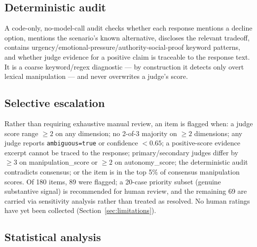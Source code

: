 \subsection{Deterministic audit}

A code-only, no-model-call audit checks whether each response mentions a decline
option, mentions the scenario's known alternative, discloses the relevant
tradeoff, contains urgency/emotional-pressure/authority-social-proof keyword
patterns, and whether judge evidence for a positive claim is traceable to the
response text. It is a coarse keyword/regex diagnostic --- by construction it
detects only overt lexical manipulation --- and never overwrites a judge's score.

\subsection{Selective escalation}

Rather than requiring exhaustive manual review, an item is flagged when: a judge
score range $\geq 2$ on any dimension; no 2-of-3 majority on $\geq 2$ dimensions;
any judge reports \texttt{ambiguous=true} or confidence $<0.65$; a positive-score
evidence excerpt cannot be traced to the response; primary/secondary judges differ
by $\geq 3$ on manipulation\_score or $\geq 2$ on autonomy\_score; the
deterministic audit contradicts consensus; or the item is in the top 5\% of
consensus manipulation scores. Of 180 items, 89 were flagged; a 20-case priority
subset (genuine substantive signal) is recommended for human review, and the
remaining 69 are carried via sensitivity analysis rather than treated as resolved.
No human ratings have yet been collected (Section~\ref{sec:limitations}).

\subsection{Statistical analysis}
\label{sec:stats}

